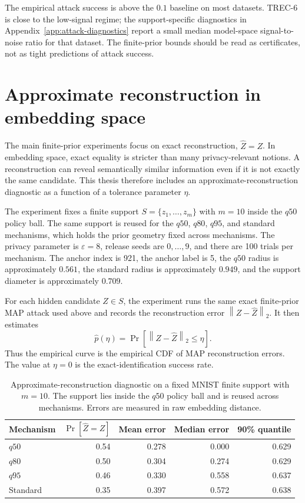 \documentclass[11pt,a4paper]{report}
\theoremstyle{plain}
\theoremstyle{definition}
\theoremstyle{remark}
\newcommand{\norm}[1]{\left\lVert #1\right\rVert}
\begin{document}
The empirical attack success is above the $0.1$ baseline on most datasets.  TREC-6 is close to the low-signal regime; the support-specific diagnostics in Appendix~\ref{app:attack-diagnostics} report a small median model-space signal-to-noise ratio for that dataset.  The finite-prior bounds should be read as certificates, not as tight predictions of attack success.

\section{Approximate reconstruction in embedding space}
\label{sec:approximate-reconstruction-experiment}

The main finite-prior experiments focus on exact reconstruction, $\widehat Z=Z$.  In embedding space, exact equality is stricter than many privacy-relevant notions.  A reconstruction can reveal semantically similar information even if it is not exactly the same candidate.  This thesis therefore includes an approximate-reconstruction diagnostic as a function of a tolerance parameter $\eta$.

The experiment fixes a finite support $S=\{z_1,\ldots,z_m\}$ with $m=10$ inside the $q50$ policy ball.  The same support is reused for the $q50$, $q80$, $q95$, and standard mechanisms, which holds the prior geometry fixed across mechanisms.  The privacy parameter is $\varepsilon=8$, release seeds are $0,\ldots,9$, and there are 100 trials per mechanism.  The anchor index is 921, the anchor label is 5, the $q50$ radius is approximately $0.561$, the standard radius is approximately $0.949$, and the support diameter is approximately $0.709$.

For each hidden candidate $Z\in S$, the experiment runs the same exact finite-prior MAP attack used above and records the reconstruction error $\norm{Z-\widehat Z}_2$.  It then estimates
\[
\widehat p(\eta)=\Pr[\norm{Z-\widehat Z}_2\le\eta].
\]
Thus the empirical curve is the empirical CDF of MAP reconstruction errors.  The value at $\eta=0$ is the exact-identification success rate.

\begin{table}[t]
\centering
\caption{Approximate-reconstruction diagnostic on a fixed MNIST finite support with $m=10$.  The support lies inside the $q50$ policy ball and is reused across mechanisms.  Errors are measured in raw embedding distance.}
\label{tab:mnist-eta-summary}
\begin{tabular}{lrrrr}
\toprule
Mechanism & $\Pr[\widehat Z=Z]$ & Mean error & Median error & 90\% quantile \\
\midrule
$q50$     & 0.54 & 0.278 & 0.000 & 0.629 \\
$q80$     & 0.50 & 0.304 & 0.274 & 0.629 \\
$q95$     & 0.46 & 0.330 & 0.558 & 0.637 \\
Standard  & 0.35 & 0.397 & 0.572 & 0.638 \\
\bottomrule
\end{tabular}
\end{table}
\end{document}
